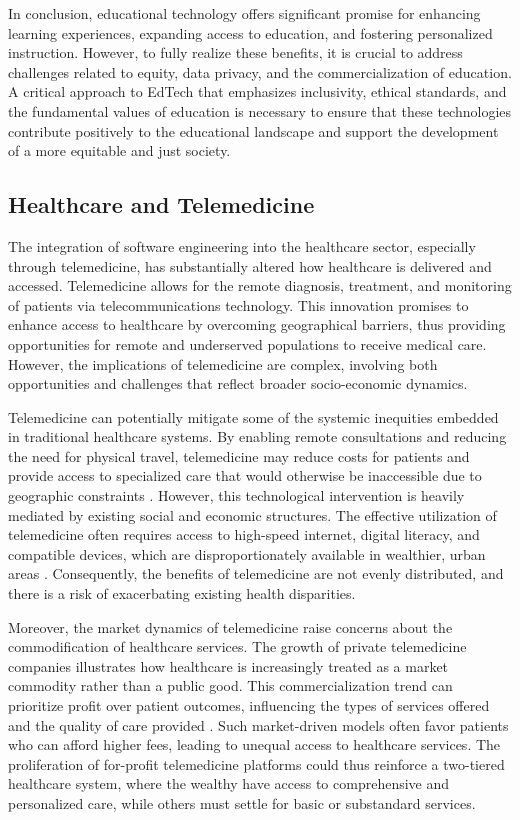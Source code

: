 \begin{refsection}
In conclusion, educational technology offers significant promise for enhancing learning experiences, expanding access to education, and fostering personalized instruction. However, to fully realize these benefits, it is crucial to address challenges related to equity, data privacy, and the commercialization of education. A critical approach to EdTech that emphasizes inclusivity, ethical standards, and the fundamental values of education is necessary to ensure that these technologies contribute positively to the educational landscape and support the development of a more equitable and just society.

\subsection{Healthcare and Telemedicine}

The integration of software engineering into the healthcare sector, especially through telemedicine, has substantially altered how healthcare is delivered and accessed. Telemedicine allows for the remote diagnosis, treatment, and monitoring of patients via telecommunications technology. This innovation promises to enhance access to healthcare by overcoming geographical barriers, thus providing opportunities for remote and underserved populations to receive medical care. However, the implications of telemedicine are complex, involving both opportunities and challenges that reflect broader socio-economic dynamics.

Telemedicine can potentially mitigate some of the systemic inequities embedded in traditional healthcare systems. By enabling remote consultations and reducing the need for physical travel, telemedicine may reduce costs for patients and provide access to specialized care that would otherwise be inaccessible due to geographic constraints \cite[pp.~102-105]{hardt_negri_empire}. However, this technological intervention is heavily mediated by existing social and economic structures. The effective utilization of telemedicine often requires access to high-speed internet, digital literacy, and compatible devices, which are disproportionately available in wealthier, urban areas \cite[pp.~76-93]{harvey_neoliberalism}. Consequently, the benefits of telemedicine are not evenly distributed, and there is a risk of exacerbating existing health disparities.

Moreover, the market dynamics of telemedicine raise concerns about the commodification of healthcare services. The growth of private telemedicine companies illustrates how healthcare is increasingly treated as a market commodity rather than a public good. This commercialization trend can prioritize profit over patient outcomes, influencing the types of services offered and the quality of care provided \cite[pp.~163-186]{marx_capital_vol1}. Such market-driven models often favor patients who can afford higher fees, leading to unequal access to healthcare services. The proliferation of for-profit telemedicine platforms could thus reinforce a two-tiered healthcare system, where the wealthy have access to comprehensive and personalized care, while others must settle for basic or substandard services.


\end{refsection}
